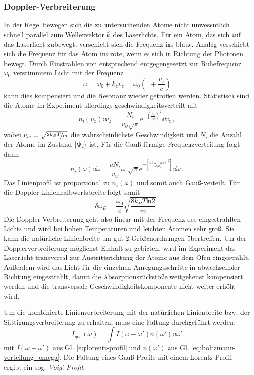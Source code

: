 \subsubsection{Doppler-Verbreiterung}\label{subsubsec:doppler-verbreiterung}
In der Regel bewegen sich die zu untersuchenden Atome nicht unwesentlich schnell
parallel zum Wellenvektor $\vec{k}$ des Laserlichts. Für ein Atom, das sich auf das
Laserlicht zubewegt, verschiebt sich die Frequenz ins blaue. Analog verschiebt
sich die Frequenz für das Atom ins rote, wenn es sich in Richtung der
Photonen bewegt. Durch Einstrahlen von entsprechend entgegengesetzt zur
Ruhefrequenz $\omega_0$ verstimmtem Licht mit der Frequenz
\begin{equation}\label{eq:doppler}
	\omega=\omega_0+k_zv_z=\omega_0\left(1+\frac{v_z}{c}\right)
\end{equation}
kann dies kompensiert und die Resonanz wieder getroffen werden. Statistisch sind
die Atome im Experiment allerdings geschwindigkeitsverteilt
\cite{demtroeder:laserspektroskopie} mit
\begin{equation}\label{eq:boltzmann-verteilung_v}
	n_i(v_z)\dd{v_z}=\frac{N_i}{v_w\sqrt{\pi}}\mathrm{e}^{-\left(\frac{v_z}{v_w}\right)^2}\dd{v_z}\,,
\end{equation}
wobei $v_w=\sqrt{\nicefrac{2k_BT}{m}}$ die wahrscheinlichste Geschwindigkeit und
$N_i$ die Anzahl der Atome im Zustand $|{\Psi_i}\rangle$ ist. Für die Gauß-förmige
Frequenzverteilung folgt dann
\begin{equation}\label{eq:boltzmann-verteilung_omega}
	n_i(\omega)\dd\omega=\frac{cN_i}{v_w}\omega_0\sqrt{\pi}\mathrm{e}^{-\left[\frac{c(\omega-\omega_0)}{\omega_0v_w}^2\right]}\dd\omega\,.
\end{equation}
Das Linienprofil ist proportional zu $n_i(\omega)$ und somit auch Gauß-verteilt.
Für die Doppler-Linienhalbwertsbreite folgt somit  
\begin{equation}\label{eq:doppler-breite}
	\delta\omega_D=\frac{\omega_0}{c}\sqrt{\frac{8k_BT\mathrm{ln}2}{m}}\,.
\end{equation}
Die Doppler-Verbreiterung geht also linear mit der Frequenz des eingestrahlten
Lichts und wird bei hohen Temperaturen und leichten Atomen sehr groß. Sie kann
die natürliche Linienbreite um gut 2 Größenordnungen übertreffen. Um der
Dopplerverbreiterung möglichst Einhalt zu gebieten, wird im Experiment das
Laserlicht transversal zur Austrittsrichtung der Atome aus dem Ofen
eingestrahlt. Außerdem wird das Licht für die einzelnen Anregungsschritte in
abwechselnder Richtung eingestrahlt, damit die Absorptionsrückstöße weitgehenst
kompensiert werden und die transversale Geschwindigkeitskomponente nicht weiter
erhöht wird.\par
Um die kombinierte Linienverbreiterung mit der natürlichen Linienbreite bzw. der
Sättigungsverbreiterung zu erhalten, muss eine Faltung durchgeführt werden:
\begin{equation}\label{eq:voigt_doppler}
	I_{ges}(\omega)=\int{I(\omega-\omega')n(\omega')\dd\omega'}
\end{equation}
mit $I(\omega-\omega')$ aus Gl. \eqref{eq:lorentz-profil} und $n(\omega')$ aus
Gl. \eqref{eq:boltzmann-verteilung_omega}. Die Faltung eines Gauß-Profils mit
einem Lorentz-Profil ergibt ein sog. \textit{Voigt-Profil}.

